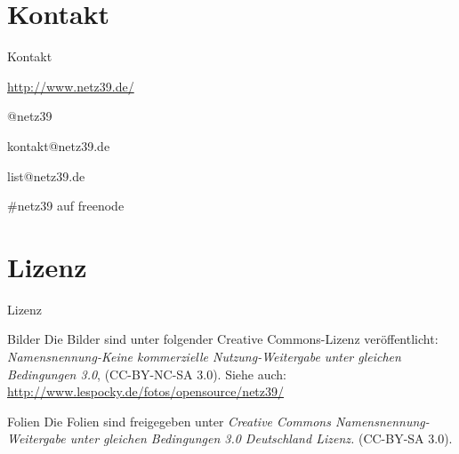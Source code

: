 \documentclass[hyperref={pdfpagelabels=false}]{beamer}
\begin{document}
\section{Kontakt}

\begin{frame}{Kontakt}
    \begin{center}
        \begin{description}
            \item[WWW] \url{http://www.netz39.de/}
            \item[Twitter/identi.ca] @netz39
            \item[E-Mail] kontakt@netz39.de
            \item[Mailingliste] list@netz39.de
            \item[IRC] \#netz39 auf freenode
        \end{description}
    \end{center}
\end{frame}

\appendix

\section{Lizenz}

\begin{frame}{Lizenz}
    \begin{block}{Bilder}
        Die Bilder sind unter folgender Creative Commons-Lizenz
        veröffentlicht: \emph{Namensnennung-Keine kommerzielle
        Nutzung-Weitergabe unter gleichen Bedingungen 3.0}, (CC-BY-NC-SA
        3.0). Siehe auch:
        \url{http://www.lespocky.de/fotos/opensource/netz39/}
    \end{block}
    \begin{block}{Folien}
        Die Folien sind freigegeben unter \emph{Creative Commons
        Namensnennung-Weitergabe unter gleichen Bedingungen 3.0 Deutschland
        Lizenz.} (CC-BY-SA 3.0).
    \end{block}
\end{frame}
\end{document}
